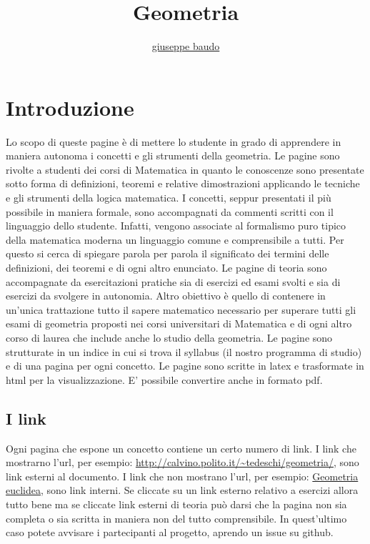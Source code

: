 \documentclass[a4paper,10pt]{article}
\title{Geometria}
\author{\href{http://www.baudo.hol.es}{giuseppe baudo}}
\begin{document}
\maketitle


\section{Introduzione}
Lo scopo di queste pagine è di mettere lo studente in grado di apprendere in maniera autonoma i concetti e gli strumenti della geometria.
Le pagine sono rivolte a studenti dei corsi di Matematica in quanto le conoscenze sono presentate sotto forma di definizioni, teoremi e relative dimostrazioni applicando le tecniche e gli strumenti della logica matematica.
I concetti, seppur presentati il più possibile in maniera formale, sono accompagnati da commenti scritti con il linguaggio dello studente.
Infatti, vengono associate al formalismo puro tipico della matematica moderna un linguaggio comune e comprensibile a tutti. Per questo si cerca di spiegare parola per
parola il significato dei termini delle definizioni, dei teoremi e di ogni altro enunciato. Le pagine di teoria sono accompagnate da
esercitazioni pratiche sia di esercizi ed esami svolti e sia di esercizi da svolgere in autonomia. Altro obiettivo è quello di contenere
in un'unica trattazione tutto il sapere matematico necessario per superare tutti gli esami di geometria proposti nei corsi universitari
di Matematica e di ogni altro corso di laurea che include anche lo studio della geometria. Le pagine sono strutturate in un indice in cui si trova
il syllabus (il nostro programma di studio) e di una pagina per ogni concetto. Le pagine sono scritte in latex e trasformate in html per la
visualizzazione. E' possibile convertire anche in formato pdf.

\subsection{I link}
Ogni pagina che espone un concetto contiene un certo numero di link. I link che mostrarno l'url, per esempio: \url{http://calvino.polito.it/~tedeschi/geometria/}, sono link 
esterni al documento. I link che non mostrano l'url, per esempio: \href{./GeometriaEuclidea.html}{Geometria euclidea}, sono link interni.
Se cliccate su un link esterno relativo a esercizi allora tutto bene ma se cliccate link esterni di teoria può darsi che la pagina non sia
completa o sia scritta in maniera non del tutto comprensibile. In quest'ultimo caso potete avvisare i partecipanti al progetto, aprendo un issue su github. 
\end{document}
